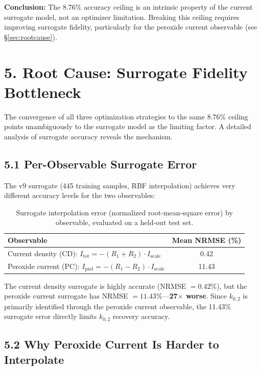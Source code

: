 \documentclass[11pt]{article}
\begin{document}
\textbf{Conclusion:} The 8.76\% accuracy ceiling is an intrinsic property of
the current surrogate model, not an optimizer limitation.  Breaking this ceiling
requires improving surrogate fidelity, particularly for the peroxide current
observable (see \S\ref{sec:rootcause}).


\section*{5. Root Cause: Surrogate Fidelity Bottleneck}\label{sec:rootcause}

The convergence of all three optimization strategies to the same 8.76\% ceiling
points unambiguously to the surrogate model as the limiting factor.  A detailed
analysis of surrogate accuracy reveals the mechanism.

\subsection*{5.1 Per-Observable Surrogate Error}

The v9 surrogate (445 training samples, RBF interpolation) achieves very
different accuracy levels for the two observables:

\begin{table}[H]
  \centering
  \caption{Surrogate interpolation error (normalized root-mean-square error)
           by observable, evaluated on a held-out test set.}
  \label{tab:surrogate_nrmse}
  \begin{tabular}{l S[round-precision=2]}
    \toprule
    Observable & {Mean NRMSE (\%)} \\
    \midrule
    Current density (CD): $I_{\text{tot}} = -(R_1 + R_2) \cdot I_{\text{scale}}$ & 0.42 \\
    Peroxide current (PC): $I_{\text{pxd}} = -(R_1 - R_2) \cdot I_{\text{scale}}$ & 11.43 \\
    \bottomrule
  \end{tabular}
\end{table}

The current density surrogate is highly accurate (NRMSE $= 0.42\%$), but the
peroxide current surrogate has NRMSE $= 11.43\%$---\textbf{27$\times$ worse}.
Since $k_{0,2}$ is primarily identified through the peroxide current observable,
the 11.43\% surrogate error directly limits $k_{0,2}$ recovery accuracy.

\subsection*{5.2 Why Peroxide Current Is Harder to Interpolate}
\end{document}
